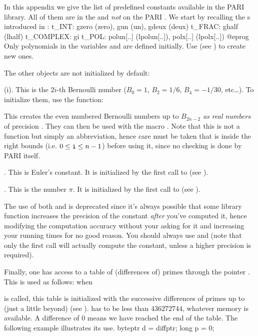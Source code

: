 
In this appendix we give the list of predefined constants available in the
PARI library. All of them are in the  and {\it not\/} on the PARI
. We start by recalling the s introduced in
:
%
\bprog
t_INT: gzero (zero), gun (un), gdeux (deux)
t_FRAC: ghalf (lhalf)
t_COMPLEX: gi
t_POL: polun[..] (lpolun[..]), polx[..] (lpolx[..])
@eprog
\noindent Only polynomials in the variables  and  are
defined initially. Use  (see ) to
create new ones.

\noindent The other objects are not initialized by default:

(i). This is the $2i$-th Bernoulli number ($B_0=1$, $B_2=1/6$,
$B_4=-1/30$, etc\dots). To initialize them, use the function:


This creates the even numbered Bernoulli numbers up to $B_{2n-2}$ {\it as
real numbers\/} of precision . They can then be used with the macro
. Note that this is not a function but simply an abbreviation,
hence care must be taken that  is inside the right bounds (i.e. $0\le
{\tt i}\le n-1$) before using it, since no checking is done by PARI itself.

. This is Euler's constant. It is initialized by the first call
to  (see ).

. This is the number $\pi$.  It is initialized by the first call to
 (see ).

The use of both  and  is deprecated since it's always
possible that some library function increases the precision of the constant
{\it after} you've computed it, hence modifying the computation accuracy
without your asking for it and increasing your running times for no good
reason. You should always use  and  (note that only
the first call will actually compute the constant, unless a higher precision
is required).

Finally, one has access to a table of (differences of) primes through the
pointer . This is used as follows: when


\noindent is called, this table is initialized with the successive
differences of primes up to (just a little beyond) 
(see ).  has to be less than $436272744$,
whatever memory is available. A
difference of $0$ means we have reached the end of the table. The following
example illustrates its use.
%
\bprog
byteptr d = diffptr;
long p = 0;

